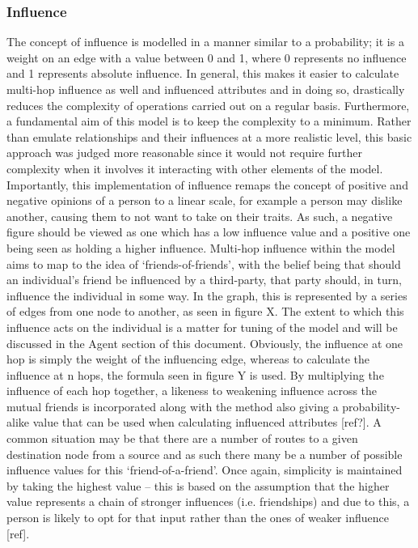 \documentclass[]{report}
\begin{document}
\subsubsection{Influence}
The concept of influence is modelled in a manner similar to a probability; it is a weight on an edge with a value between 0 and 1, where 0 represents no influence and 1 represents absolute influence. In general, this makes it easier to calculate multi-hop influence as well and influenced attributes and in doing so, drastically reduces the complexity of operations carried out on a regular basis. Furthermore, a fundamental aim of this model is to keep the complexity to a minimum. Rather than emulate relationships and their influences at a more realistic level, this basic approach was judged more reasonable since it would not require further complexity when it involves it interacting with other elements of the model. Importantly, this implementation of influence remaps the concept of positive and negative opinions of a person to a linear scale, for example a person may dislike another, causing them to not want to take on their traits. As such, a negative figure should be viewed as one which has a low influence value and a positive one being seen as holding a higher influence. 
Multi-hop influence within the model aims to map to the idea of `friends-of-friends', with the belief being that should an individual's friend be influenced by a third-party, that party should, in turn, influence the individual in some way. In the graph, this is represented by a series of edges from one node to another, as seen in figure X. The extent to which this influence acts on the individual is a matter for tuning of the model and will be discussed in the Agent section of this document. Obviously, the influence at one hop is simply the weight of the influencing edge, whereas to calculate the influence at n hops, the formula seen in figure Y is used. By multiplying the influence of each hop together, a likeness to weakening influence across the mutual friends is incorporated along with the method also giving a probability-alike value that can be used when calculating influenced attributes [ref?]. A common situation may be that there are a number of routes to a given destination node from a source and as such there many be a number of possible influence values for this `friend-of-a-friend'. Once again, simplicity is maintained by taking the highest value – this is based on the assumption that the higher value represents a chain of stronger influences (i.e. friendships) and due to this, a person is likely to opt for that input rather than the ones of weaker influence [ref].
\end{document}
